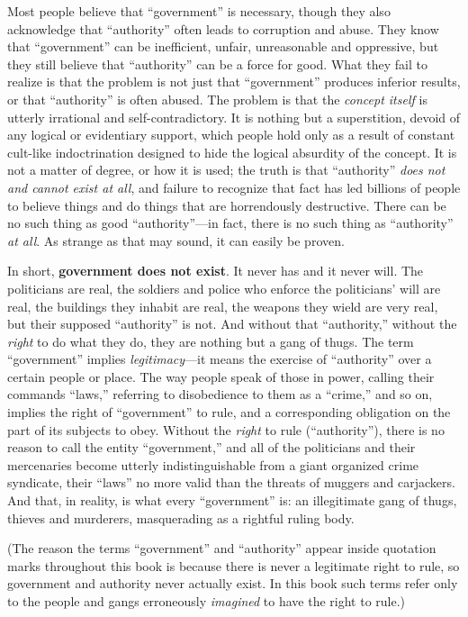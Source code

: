 \documentclass{book}
\begin{document}
Most people believe that \enquote{government} is necessary, though they also acknowledge that \enquote{authority} often leads to corruption and abuse. They know that \enquote{government} can be inefficient, unfair, unreasonable and oppressive, but they still believe that \enquote{authority} can be a force for good. What they fail to realize is that the problem is not just that \enquote{government} produces inferior results, or that \enquote{authority} is often abused. The problem is that the \emph{concept itself} is utterly irrational and self-contradictory. It is nothing but a superstition, devoid of any logical or evidentiary support, which people hold only as a result of constant cult-like indoctrination designed to hide the logical absurdity of the concept. It is not a matter of degree, or how it is used; the truth is that \enquote{authority} \emph{does not and cannot exist at all}, and failure to recognize that fact has led billions of people to believe things and do things that are horrendously destructive. There can be no such thing as good \enquote{authority}---in fact, there is no such thing as \enquote{authority} \emph{at all}. As strange as that may sound, it can easily be proven.

In short, \textbf{government does not exist}. It never has and it never will. The politicians are real, the soldiers and police who enforce the politicians' will are real, the buildings they inhabit are real, the weapons they wield are very real, but their supposed \enquote{authority} is not. And without that \enquote{authority,} without the \emph{right} to do what they do, they are nothing but a gang of thugs. The term \enquote{government} implies \emph{legitimacy}---it means the exercise of \enquote{authority} over a certain people or place. The way people speak of those in power, calling their commands \enquote{laws,} referring to disobedience to them as a \enquote{crime,} and so on, implies the right of \enquote{government} to rule, and a corresponding obligation on the part of its subjects to obey. Without the \emph{right} to rule (\enquote{authority}), there is no reason to call the entity \enquote{government,} and all of the politicians and their mercenaries become utterly indistinguishable from a giant organized crime syndicate, their \enquote{laws} no more valid than the threats of muggers and carjackers. And that, in reality, is what every \enquote{government} is: an illegitimate gang of thugs, thieves and murderers, masquerading as a rightful ruling body.

(The reason the terms \enquote{government} and \enquote{authority} appear inside quotation marks throughout this book is because there is never a legitimate right to rule, so government and authority never actually exist. In this book such terms refer only to the people and gangs erroneously \emph{imagined} to have the right to rule.)
\end{document}
